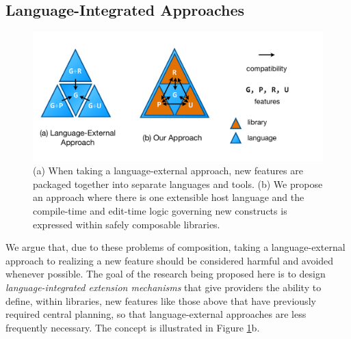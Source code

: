 \subsection{Language-Integrated Approaches}\label{language-integrated-approaches}
\begin{figure}
\begin{center}
\includegraphics[scale=.48]{approaches.pdf}
\end{center}
\vspace{-20px}
\caption{\small (a) When taking a language-external approach, new features are packaged together into separate languages and tools. (b) We propose an approach where there is one extensible host language and the compile-time and edit-time logic governing new constructs is expressed within safely composable libraries.}
\label{approaches}
\end{figure}
We argue that, due to these problems of composition, taking a language-external approach to realizing a new feature should be considered harmful and avoided whenever possible. The goal of the research being proposed here is to design \emph{language-integrated extension mechanisms} that give providers the ability to define, within libraries, new features like those above that have previously required central planning, 
so that language-external approaches are less frequently necessary. The concept is  illustrated in Figure \ref{approaches}b. %

